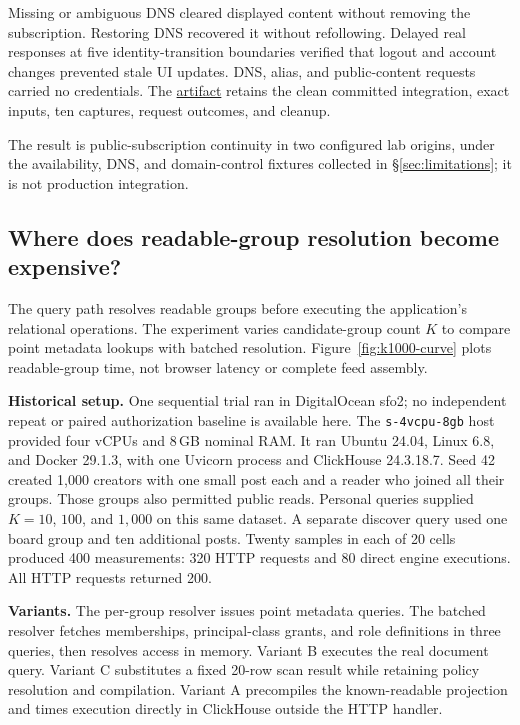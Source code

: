 \documentclass[sigconf, nonacm]{acmart}
\newcommand{\artifactbase}{https://github.com/jacoby149/web10}
\newcommand{\domainartifactrev}{26720acba859c7eb03fc5d26a6221cdde5b764a1}
\newcommand{\evidence}[2]{\href{\artifactbase/tree/\domainartifactrev/#1}{#2}}
\begin{document}
Missing or ambiguous DNS cleared displayed content without removing
the subscription. Restoring DNS recovered it without refollowing.
Delayed real responses at five identity-transition boundaries verified
that logout and account changes prevented stale UI updates. DNS, alias,
and public-content requests carried no credentials. The
\evidence{research/domain-portability-demo}{artifact} retains the clean
committed integration, exact inputs, ten captures, request outcomes,
and cleanup.

The result is public-subscription continuity in two configured lab
origins, under the availability, DNS, and domain-control fixtures
collected in \S\ref{sec:limitations}; it is not production integration.

\subsection{Where does readable-group resolution become expensive?}
\label{sec:ev-cost}

The query path resolves readable groups before executing the application's
relational operations. The experiment varies candidate-group count
$K$ to compare point metadata lookups with batched resolution.
Figure~\ref{fig:k1000-curve} plots readable-group time, not browser
latency or complete feed assembly.

\textbf{Historical setup.} One sequential trial ran in DigitalOcean sfo2;
no independent repeat or paired authorization baseline is available here.
The \texttt{s-4vcpu-8gb} host provided four vCPUs and 8\,GB nominal RAM.
It ran Ubuntu 24.04, Linux 6.8, and Docker 29.1.3, with one Uvicorn
process and ClickHouse 24.3.18.7.
Seed 42 created 1,000 creators with one small post each and a reader who
joined all their groups. Those groups also permitted public reads.
Personal queries supplied $K=10$, $100$, and $1{,}000$ on this same
dataset. A separate discover query used one board group and ten
additional posts. Twenty samples in each of 20 cells produced 400
measurements: 320 HTTP requests and 80 direct engine executions.
All HTTP requests returned 200.

\textbf{Variants.} The per-group resolver issues point metadata queries.
The batched resolver fetches memberships, principal-class grants, and
role definitions in three queries, then resolves access in memory.
Variant B executes the real document query. Variant C substitutes a
fixed 20-row scan result while retaining policy resolution and
compilation. Variant A precompiles the known-readable projection and
times execution directly in ClickHouse outside the HTTP handler.
\end{document}
